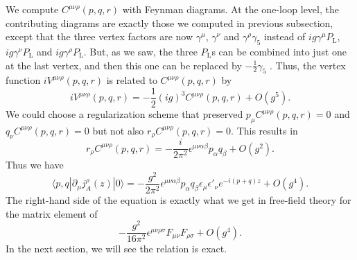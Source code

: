 We compute $C^{\mu\nu\rho}(p,q,r)$ with Feynman diagrams. At the one-loop level, the contributing diagrams are exactly those we computed in previous subsection, except that the three vertex factors are now $\gamma^{\mu}$, $\gamma^{\nu}$ and $\gamma^{\rho}\gamma_5$ instead of $ig\gamma^{\mu}P_{\mathrm{L}}$, $ig\gamma^{\nu}P_{\mathrm{L}}$ and $ig\gamma^{\rho}P_{\mathrm{L}}$. But, as we saw, the three $P_{\mathrm{L}}$s can be combined into just one at the last vertex, and then this one can be replaced by $-\frac{1}{2}\gamma_5$ . Thus, the vertex function $iV^{\mu\nu\rho}(p,q,r)$ is related to $C^{\mu\nu\rho}(p,q,r)$ by
\[iV^{\mu\nu\rho}(p,q,r) = -\frac{1}{2}(ig)^3 C^{\mu\nu\rho}(p,q,r) + O(g^5).\]
We could choose a regularization scheme that
preserved $p_{\mu}C^{\mu\nu\rho}(p,q,r) = 0$ and $q_{\nu}C^{\mu\nu\rho}(p,q,r) = 0$ but not also $r_{\rho}C^{\mu\nu\rho}(p,q,r) = 0$. This results in
\[r_{\rho}C^{\mu\nu\rho}(p,q,r) = -\frac{i}{2\pi^2} \epsilon^{\mu\nu\alpha\beta} p_{\alpha} q_{\beta} + O(g^2).\]
Thus we have
\[\langle p,q | \partial_{\mu} j^{\rho}_A(z) |  0 \rangle  = - \frac{g^2}{2\pi^2} \epsilon^{\mu\nu\alpha\beta} p_{\alpha} q_{\beta} \epsilon_{\mu} \epsilon'_{\nu} e^{-i(p+q)z} + O(g^4) .\]
The right-hand side of the equation is exactly what we get in free-field theory for the matrix element of
\[- \frac{g^2}{16\pi^2} \epsilon^{\mu\nu\rho\sigma}F_{\mu\nu}F_{\rho\sigma} + O(g^4) .\]
In the next section, we will see the relation is exact.

